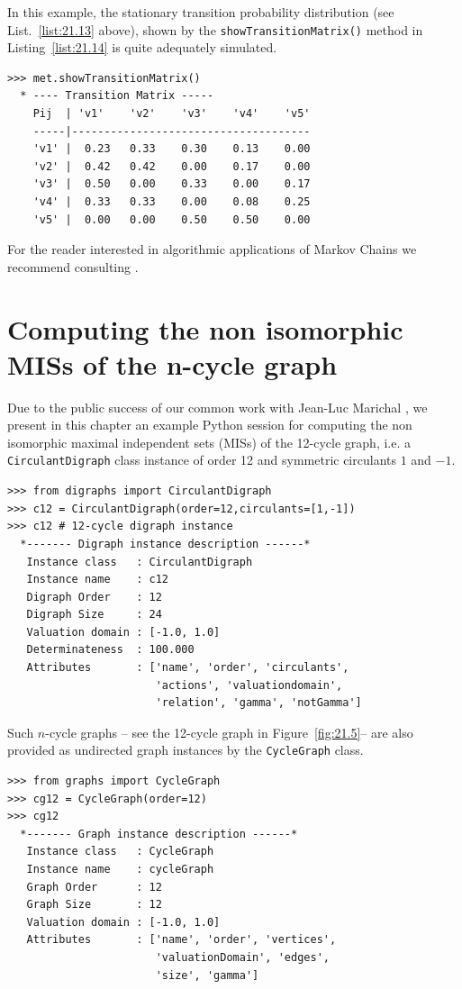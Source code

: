 In this example, the stationary transition probability distribution (see List.~\vref{list:21.13} above), shown by the \texttt{showTransitionMatrix()} method in Listing~\vref{list:21.14} is quite adequately simulated.
\begin{lstlisting}[caption={Printing the transition probability distribution},label=list:21.14]
>>> met.showTransitionMatrix()
  * ---- Transition Matrix -----
    Pij  | 'v1'    'v2'    'v3'    'v4'    'v5'
    -----|-------------------------------------
    'v1' |  0.23   0.33    0.30    0.13    0.00
    'v2' |  0.42   0.42    0.00    0.17    0.00
    'v3' |  0.50   0.00    0.33    0.00    0.17
    'v4' |  0.33   0.33    0.00    0.08    0.25
    'v5' |  0.00   0.00    0.50    0.50    0.00
\end{lstlisting}

For the reader interested in algorithmic applications of Markov Chains we recommend consulting \citet{HAG-2002}.

\section{Computing the non isomorphic MISs of the n-cycle graph}
\label{sec:21.7}

Due to the public success of our common work with Jean-Luc Marichal \citep{ISO-2008}, we present in this chapter an example Python session for computing the non isomorphic maximal independent sets (MISs) of the 12-cycle graph, i.e. a \texttt{CirculantDigraph} class instance of order 12 and symmetric circulants $1$ and $-1$.
\begin{lstlisting}
>>> from digraphs import CirculantDigraph
>>> c12 = CirculantDigraph(order=12,circulants=[1,-1])
>>> c12 # 12-cycle digraph instance
  *------- Digraph instance description ------*
   Instance class   : CirculantDigraph
   Instance name    : c12
   Digraph Order    : 12
   Digraph Size     : 24
   Valuation domain : [-1.0, 1.0]
   Determinateness  : 100.000
   Attributes       : ['name', 'order', 'circulants',
                       'actions', 'valuationdomain',
                       'relation', 'gamma', 'notGamma']
\end{lstlisting}

Such $n$-cycle graphs -- see the 12-cycle graph in Figure~\vref{fig:21.5}-- are also provided as undirected graph instances by the \texttt{CycleGraph} class.
\begin{lstlisting}
>>> from graphs import CycleGraph
>>> cg12 = CycleGraph(order=12)
>>> cg12
  *------- Graph instance description ------*
   Instance class   : CycleGraph
   Instance name    : cycleGraph
   Graph Order      : 12
   Graph Size       : 12
   Valuation domain : [-1.0, 1.0]
   Attributes       : ['name', 'order', 'vertices',
                       'valuationDomain', 'edges',
                       'size', 'gamma']
\end{lstlisting}

